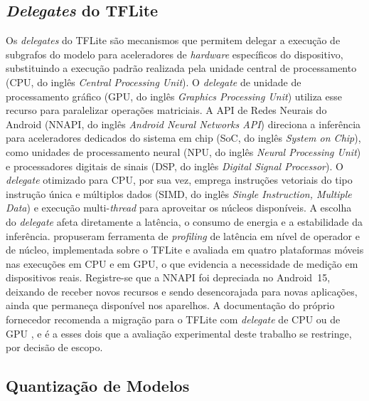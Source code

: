 \documentclass[artigo,times,capa]{iftex2024}
\begin{document}
\subsection{\textit{Delegates} do TFLite}
 
Os \textit{delegates} do \ac{TFLite} são mecanismos que permitem delegar a execução de subgrafos do modelo para aceleradores de \textit{hardware} específicos do dispositivo, substituindo a execução padrão realizada pela unidade central de processamento (CPU, do inglês \textit{Central Processing Unit}). O \textit{delegate} de unidade de processamento gráfico (GPU, do inglês \textit{Graphics Processing Unit}) utiliza esse recurso para paralelizar operações matriciais. A API de Redes Neurais do Android (NNAPI, do inglês \textit{Android Neural Networks API}) direciona a inferência para aceleradores dedicados do sistema em chip (SoC, do inglês \textit{System on Chip}), como unidades de processamento neural (NPU, do inglês \textit{Neural Processing Unit}) e processadores digitais de sinais (DSP, do inglês \textit{Digital Signal Processor}). O \textit{delegate} otimizado para \ac{CPU}, por sua vez, emprega instruções vetoriais do tipo instrução única e múltiplos dados (SIMD, do inglês \textit{Single Instruction, Multiple Data}) e execução multi-\textit{thread} para aproveitar os núcleos disponíveis. A escolha do \textit{delegate} afeta diretamente a latência, o consumo de energia e a estabilidade da inferência. \textcite{Chu2023nnPerf} propuseram ferramenta de \textit{profiling} de latência em nível de operador e de núcleo, implementada sobre o \ac{TFLite} e avaliada em quatro plataformas móveis nas execuções em \ac{CPU} e em \ac{GPU}, o que evidencia a necessidade de medição em dispositivos reais. Registre-se que a \ac{NNAPI} foi depreciada no Android~15, deixando de receber novos recursos e sendo desencorajada para novas aplicações, ainda que permaneça disponível nos aparelhos. A documentação do próprio fornecedor recomenda a migração para o \ac{TFLite} com \textit{delegate} de \ac{CPU} ou de \ac{GPU} \cite{Android2026NNAPI}, e é a esses dois que a avaliação experimental deste trabalho se restringe, por decisão de escopo.
 
\subsection{Quantização de Modelos}
 
\end{document}
